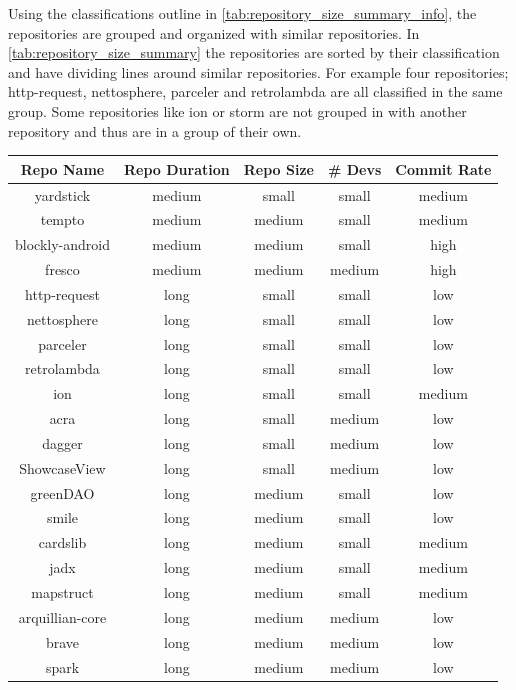 Using the classifications outline in \autoref{tab:repository_size_summary_info}, the repositories are grouped and organized with similar repositories. In \autoref{tab:repository_size_summary} the repositories are sorted by their classification and have dividing lines around similar repositories. For example four repositories; http-request, nettosphere, parceler and retrolambda are all classified in the same group. Some repositories like ion or storm are not grouped in with another repository and thus are in a group of their own.

\begin{table}
\begin{center}
    \begin{tabular}{|c|c|c|c|c|}
        \hline
        Repo Name & Repo Duration & Repo Size & \# Devs & Commit Rate \\
        \hline
        \hline
        yardstick & medium & small & small & medium \\
        \hline
        tempto & medium & medium & small & medium \\
        \hline
        blockly-android & medium & medium & small & high \\
        \hline
        fresco & medium & medium & medium & high \\
        \hline
        http-request & long & small & small & low \\
        nettosphere & long & small & small & low \\
        parceler & long & small & small & low \\
        retrolambda & long & small & small & low \\
        \hline
        ion & long & small & small & medium \\
        \hline
        acra & long & small & medium & low \\
        dagger & long & small & medium & low \\
        ShowcaseView & long & small & medium & low \\
        \hline
        greenDAO & long & medium & small & low \\
        smile & long & medium & small & low \\
        \hline
        cardslib & long & medium & small & medium \\
        jadx & long & medium & small & medium \\        
        mapstruct & long & medium & small & medium \\
        \hline
        arquillian-core & long & medium & medium & low \\
        brave & long & medium & medium & low \\
        spark & long & medium & medium & low \\
        \hline    
        

\end{tabular}
\end{center}
\end{table}
